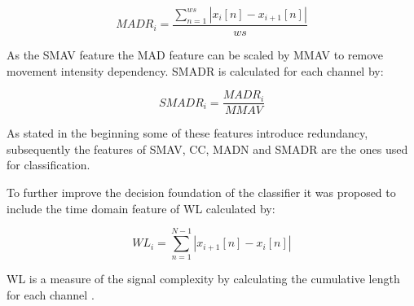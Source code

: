 \begin{equation} \label{eq:MADR}
MADR_i=\frac{\sum_{n=1}^{ws}|x_i[n]-x_{i+1}[n]|}{ws}
\end{equation}

As the SMAV feature the MAD feature can be scaled by MMAV to remove movement intensity dependency. SMADR is calculated for each channel by:

\begin{equation} \label{eq:MMADR}
SMADR_i=\frac{MADR_i}{MMAV}
\end{equation}


As stated in the beginning some of these features introduce redundancy, subsequently the features of SMAV, CC, MADN and SMADR are the ones used for classification. \cite{Donovan2017}

To further improve the decision foundation of the classifier it was proposed to include the time domain feature of WL calculated by: 

\begin{equation} \label{eq:WL}
WL_i=\sum_{n=1}^{N-1}|x_{i+1}[n]-x_i[n]|
\end{equation}

WL is a measure of the signal complexity by calculating the cumulative length for each channel \cite{Phiny2012}.




